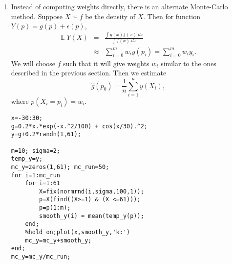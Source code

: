 \documentclass[11pt,twocolumn]{article} %
\newcommand{\bqn}{\begin{eqnarray*}}
\newcommand{\eqn}{\end{eqnarray*}}
\begin{document}
\begin{enumerate}
\item Instead of computing weights directly, there is an alternate
Monte-Carlo method. Suppose $X \sim f$ be the density of $X$. Then
for function $Y(p) =g(p) + \epsilon(p)$, \bqn \mathbb{E}  \;Y(X)
&=&
\frac{\int y(x)f(x) \;dx}{\int f(x) \; dx} \\
&\approx& \sum_{i=0}^m w_iy(p_i) = \sum_{i=0}^m w_iy_i.\eqn We
will choose $f$ such that it will give weights $w_i$ similar to
the ones described in the previous section. Then we estimate
$$\widehat g(p_0) = \frac{1}{n}\sum_{i=1}^{n} y(X_i),$$
where $p(X_i =p_i) = w_i$.
\begin{verbatim}
x=-30:30;
g=0.2*x.*exp(-x.^2/100) + cos(x/30).^2;
y=g+0.2*randn(1,61);

m=10; sigma=2;
temp_y=y;
mc_y=zeros(1,61); mc_run=50;
for i=1:mc_run
    for i=1:61
        X=fix(normrnd(i,sigma,100,1));
        p=X(find((X>=1) & (X <=61)));
        p=p(1:m);
        smooth_y(i) = mean(temp_y(p));
    end;
    %hold on;plot(x,smooth_y,'k:')
    mc_y=mc_y+smooth_y;
end;
mc_y=mc_y/mc_run;
\end{verbatim}
\end{enumerate}
\end{document}
